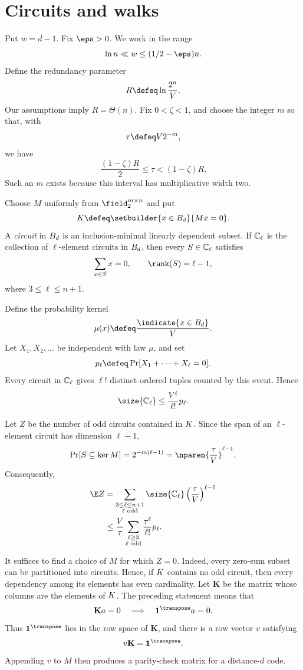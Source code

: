 \section{Circuits and walks}
\label{sec:approach}

Put $w=d-1$.
Fix $\eps>0$.  We work in the range
$$
\ln n\ll w\le(1/2-\eps)n.
$$
Define the redundancy parameter
$$
R\defeq\ln\frac{2^n}{V}.
$$
Our assumptions imply $R=\Theta(n)$.  Fix
$0<\zeta<1$, and choose the integer $m$ so that, with
$$
\tau\defeq V2^{-m},
$$
we have
$$
\frac{(1-\zeta)R}{2}
\le\tau<(1-\zeta)R.
$$
Such an $m$ exists because this interval has multiplicative width
two.

Choose $M$ uniformly from $\field_2^{m\times n}$ and put
$$
\kero\defeq\setbuilder{x\in\ball}{Mx=0}.
$$
A \emph{circuit} in $B_d$ is an inclusion-minimal linearly
dependent subset.  If $\mathbb C_\ell$ is the collection of
$\ell$-element circuits in $B_d$, then every
$S\in\mathbb C_\ell$ satisfies
$$
\sum_{x\in S}x=0,
\qquad
\rank(S)=\ell-1,
$$
where $3\le\ell\le n+1$.

Define the probability kernel
$$
\mu(x)\defeq\frac{\indicate{x\in\ball}}{V}.
$$
Let $X_1,X_2,\ldots$ be independent with law $\mu$, and set
$$
p_\ell\defeq\Pr[X_1+\cdots+X_\ell=0].
$$
Every circuit in $\mathbb C_\ell$ gives $\ell!$ distinct ordered
tuples counted by this event.  Hence
$$
\size{\circuit_\ell}
\le\frac{V^\ell}{\ell!}p_\ell.
$$

Let $Z$ be the number of odd circuits contained in $K$.
Since the span of an $\ell$-element circuit has dimension
$\ell-1$,
$$
\Pr[S\subseteq\ker M]
=2^{-m(\ell-1)}
=\nparen{\frac{\tau}{V}}^{\ell-1}.
$$
Consequently,
$$
\begin{aligned}
\E Z
&=\sum_{\substack{3\le\ell\le n+1\\\ell\text{ odd}}}
  \size{\circuit_\ell}
  \left(\frac{\tau}{V}\right)^{\ell-1}\\
&\le\frac V\tau
  \sum_{\substack{\ell\ge3\\\ell\text{ odd}}}
  \frac{\tau^\ell}{\ell!}p_\ell.
\end{aligned}
$$

It suffices to find a choice of $M$ for which $Z=0$.  Indeed,
every zero-sum subset can be partitioned into circuits.  Hence, if
$K$ contains no odd circuit, then every dependency among its
elements has even cardinality.  Let $\mathbf K$ be the matrix whose
columns are the elements of $K$.  The preceding statement means
that
$$
\mathbf K a=0
\quad\Longrightarrow\quad
\mathbf1^\transpose a=0.
$$
Thus $\mathbf1^\transpose$ lies in the row space of $\mathbf K$,
and there is a row vector $v$ satisfying
$$
v\mathbf K=\mathbf1^\transpose.
$$
Appending $v$ to $M$ then produces a parity-check matrix for a
distance-$d$ code.


